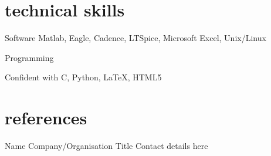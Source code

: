 \documentclass[]{friggeri-cv} %
\begin{document}

\section{technical skills}

\begin{entrylist}




\entry
{}
{Software}
{}
{}
{
Matlab, Eagle, Cadence, LTSpice, Microsoft Excel, Unix/Linux
}



\entry
{}
{Programming}
{}
{}
{
Confident with C, Python, \LaTeX, HTML5

}




\end{entrylist}





\section{references}


\begin{entrylist}


\entry
{}
{Name}
{Company/Organisation}
{Title}
{
Contact details here
}
\end{entrylist} 

\end{document}
